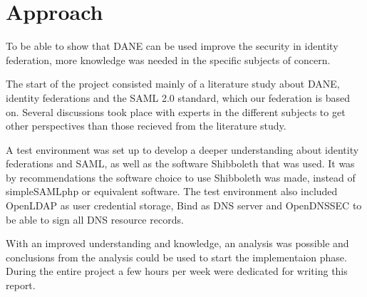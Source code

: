\section{Approach}



To be able to show that DANE can be used improve the security in identity federation, more knowledge was needed in the specific subjects of concern.

The start of the project consisted mainly of a literature study about DANE, identity federations and the SAML 2.0 standard, which our federation is based on. 
Several discussions took place with experts in the different subjects to get other perspectives than those recieved from the literature study.

A test environment was set up to develop a deeper understanding about identity federations and SAML, as well as the software 
Shibboleth that was used. 
It was by recommendations the software choice to use Shibboleth was made, instead of simpleSAMLphp or equivalent software.
The test environment also included OpenLDAP as user credential storage, Bind as DNS server and OpenDNSSEC to be able to sign all DNS resource records.

With an improved understanding and knowledge, an analysis was possible and conclusions from the analysis could be used 
to start the implementaion phase. During the entire project a few hours per week were dedicated for writing this report.



 


